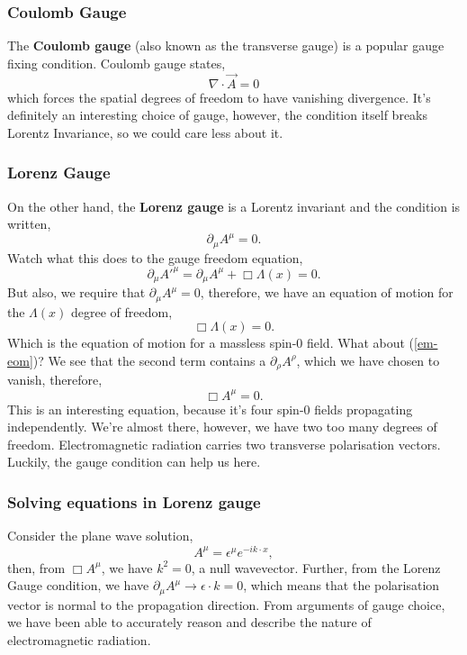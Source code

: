 \subsubsection{Coulomb Gauge}
The \textbf{Coulomb gauge} (also known as the transverse gauge) is a popular gauge fixing condition. Coulomb gauge states, 
\begin{equation}
    \nabla\cdot\vec{A} = 0
\end{equation}
which forces the spatial degrees of freedom to have vanishing divergence. 
It's definitely an interesting choice of gauge, however, the condition itself breaks Lorentz Invariance, so we could care less about it.

\subsubsection{Lorenz Gauge}
On the other hand, the \textbf{Lorenz gauge} is a Lorentz invariant and the condition is written, 
\begin{equation}
    \partial_{\mu}A^{\mu} = 0.
\end{equation}
Watch what this does to the gauge freedom equation,
\begin{equation}
    \partial_{\mu}A'^{\mu} = \partial_{\mu}A^{\mu} + \Box\Lambda(x) = 0.
\end{equation}
But also, we require that $\partial_{\mu}A^{\mu}=0$, therefore, we have an equation of motion for the $\Lambda(x)$ degree of freedom,
\begin{equation}
    \Box\Lambda(x) = 0.
\end{equation}
Which is the equation of motion for a massless spin-0 field. What about (\ref{em-eom})? We see that the second term contains a $\partial_{\rho}A^{\rho}$, which we have chosen to vanish, therefore, 
\begin{equation}\label{em-eom-reduced}
\Box A^{\mu} = 0.
\end{equation}
This is an interesting equation, because it's four spin-0 fields propagating independently. We're almost there, however, we have two too many degrees of freedom. Electromagnetic radiation carries two transverse polarisation vectors. Luckily, the gauge condition can help us here. 
\subsubsection{Solving equations in Lorenz gauge}
Consider the plane wave solution,
\begin{equation}
    A^{\mu} = \epsilon^{\mu}e^{-ik\cdot x},
\end{equation}
then, from $\Box A^{\mu}$, we have $k^2=0$, a null wavevector. Further, from the Lorenz Gauge condition, we have $\partial_{\mu}A^{\mu} \rightarrow \epsilon\cdot k=0$, which means that the polarisation vector is normal to the propagation direction. From arguments of gauge choice, we have been able to accurately reason and describe the nature of electromagnetic radiation. 

